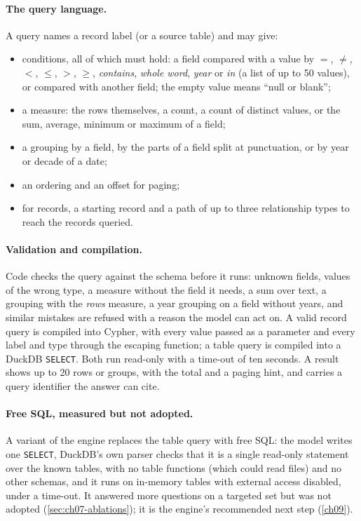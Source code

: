 \paragraph{The query language.} A query names a record label (or a source table) and may give:
\begin{itemize}[nosep]
\item conditions, all of which must hold: a field compared with a value by $=$, $\neq$, $<$, $\leq$, $>$, $\geq$,
\emph{contains}, \emph{whole word}, \emph{year} or \emph{in} (a list of up to 50 values), or compared with another
field; the empty value means ``null or blank'';
\item a measure: the rows themselves, a count, a count of distinct values, or the sum, average, minimum or maximum
of a field;
\item a grouping by a field, by the parts of a field split at punctuation, or by year or decade of a date;
\item an ordering and an offset for paging;
\item for records, a starting record and a path of up to three relationship types to reach the records queried.
\end{itemize}

\paragraph{Validation and compilation.} Code checks the query against the schema before it runs: unknown fields,
values of the wrong type, a measure without the field it needs, a sum over text, a grouping with the
\emph{rows} measure, a year grouping on a field without years, and similar mistakes are refused with a reason the
model can act on. A valid record query is compiled into Cypher, with every value passed as a parameter and every
label and type through the escaping function; a table query is compiled into a DuckDB \texttt{SELECT}. Both run
read-only with a time-out of ten seconds. A result shows up to 20 rows or groups, with the total and a paging hint,
and carries a query identifier the answer can cite.

\paragraph{Free SQL, measured but not adopted.} A variant of the engine replaces the table query with free SQL: the
model writes one \texttt{SELECT}, DuckDB's own parser checks that it is a single read-only statement over the known
tables, with no table functions (which could read files) and no other schemas, and it runs on in-memory tables
with external access disabled, under a time-out. It answered more questions on a targeted set but was not adopted
(\cref{sec:ch07-ablations}); it is the engine's recommended next step (\cref{ch09}).

